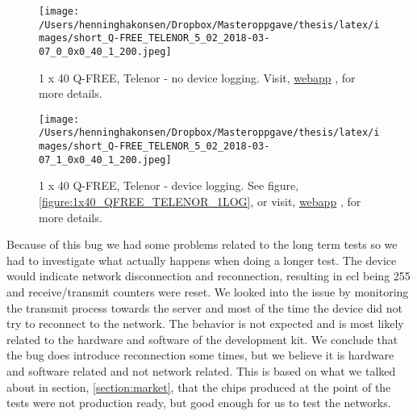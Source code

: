 \documentclass[USenglish]{ifimaster}  %
\begin{document}
\begin{figure}[H]
  \centering
  \texttt{[image: /Users/henninghakonsen/Dropbox/Masteroppgave/thesis/latex/images/short\_Q-FREE\_TELENOR\_5\_02\_2018-03-07\_0\_0x0\_40\_1\_200.jpeg]}
  \caption{1 x 40 Q-FREE, Telenor - no device logging. Visit, \href{http://158.39.77.97:9000/\#/results/Q-FREE_TELENOR\_5.02\_2018-03-07\_0\_0x0\_40\_1\_200}{webapp} \cite{online:result3}, for more details.}
  \label{figure:1x40_QFREE_TELENOR_0LOG_SHORT}
\end{figure}

\begin{figure}[H]
  \centering
  \texttt{[image: /Users/henninghakonsen/Dropbox/Masteroppgave/thesis/latex/images/short\_Q-FREE\_TELENOR\_5\_02\_2018-03-07\_1\_0x0\_40\_1\_200.jpeg]}
  \caption{1 x 40 Q-FREE, Telenor - device logging. See figure, \vref{figure:1x40_QFREE_TELENOR_1LOG}, or visit, \href{http://158.39.77.97:9000/\#/results/Q-FREE\_TELENOR\_5.02\_2018-03-07\_1\_0x0\_40\_1\_200}{webapp} \cite{online:result4}, for more details.}
  \label{figure:1x40_QFREE_TELENOR_1LOG_SHORT}
\end{figure}

Because of this bug we had some problems related to the long term tests so we had to investigate what actually happens when doing a longer test. The device would indicate network disconnection and reconnection, resulting in \acrshort{ecl} being 255 and receive/transmit counters were reset. We looked into the issue by monitoring the transmit process towards the server and most of the time the device did not try to reconnect to the network. The behavior is not expected and is most likely related to the hardware and software of the development kit. We conclude that the bug does introduce reconnection some times, but we believe it is hardware and software related and not network related. This is based on what we talked about in section, \vref{section:market}, that the chips produced at the point of the tests were not production ready, but good enough for us to test the networks.
\end{document}
